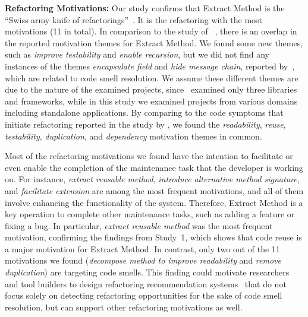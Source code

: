 \noindent\textbf{Refactoring Motivations:} Our study confirms that {\textsc Extract Method} is  the 
``Swiss army knife of refactorings''~\citep{tsantalis_empiricalstudy}. It is the refactoring with the most motivations (11 in total).
In comparison to the study of ~\cite{tsantalis_empiricalstudy}, there is an overlap in the reported motivation themes for {\textsc Extract Method}.
We found some new themes, such as \emph{improve testability} and \emph{enable recursion}, but we did not find any instances of
the themes \emph{encapsulate field} and \emph{hide message chain}, reported by~\cite{tsantalis_empiricalstudy}, which are related to code smell resolution.
We assume these different themes are due to the nature of the examined projects, since~\cite{tsantalis_empiricalstudy} examined only
three libraries and frameworks, while in this study we examined \studiedProjects projects from various domains including standalone applications.
By comparing to the code symptoms that initiate refactoring reported in the study by \cite{kim-tse-2014}, we found the \emph{readability},
\emph{reuse}, \emph{testability}, \emph{duplication}, and \emph{dependency} motivation themes in common.

Most of the refactoring motivations we found have the intention to facilitate or even enable the completion of the maintenance task that the developer is working on.
For instance, \emph{extract reusable method}, \emph{introduce alternative method signature}, and \emph{facilitate extension}
are among the most frequent motivations, and all of them involve enhancing the functionality of the system.
Therefore, {\textsc Extract Method} is a key operation to complete other
maintenance tasks, such as adding a feature or fixing a bug.
In particular, \emph{extract reusable method} was the most frequent motivation, confirming the findings from Study~1, which shows that code reuse is a major motivation for Extract Method.
In contrast, only two out of the 11 motivations we found (\emph{decompose method to improve readability} and \emph{remove duplication}) are targeting code smells. %
This finding could motivate researchers and tool builders to design
refactoring recommendation systems~\citep{Tsantalis:2011, Silva:2014, Tairas:2012, Hotta:2012, Meng:2015, Tsantalis:2015}
that do not focus solely on detecting refactoring opportunities for the sake of code smell resolution, but can support other refactoring motivations as well.

